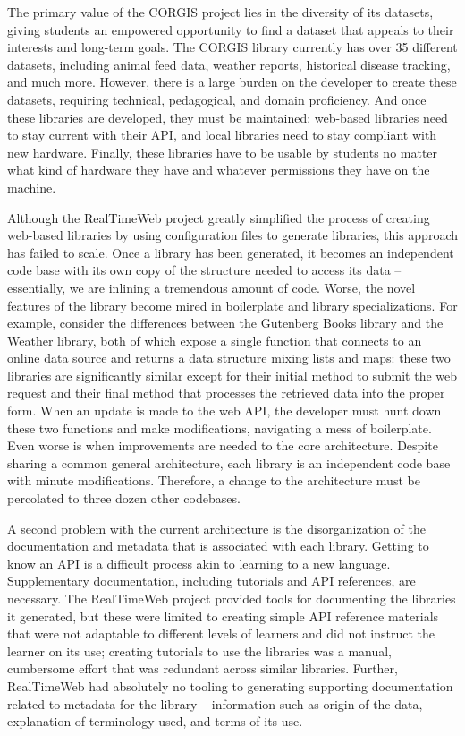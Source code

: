 	The primary value of the CORGIS project lies in the diversity of its datasets, giving students an empowered opportunity to find a dataset that appeals to their interests and long-term goals.
        The CORGIS library currently has over 35 different datasets, including animal feed data, weather reports, historical disease tracking, and much more.
    However, there is a large burden on the developer to create these datasets, requiring technical, pedagogical, and domain proficiency.
	And once these libraries are developed, they must be maintained: web-based libraries need to stay current with their API, and local libraries need to stay compliant with new hardware.
    Finally, these libraries have to be usable by students no matter what kind of hardware they have and whatever permissions they have on the machine.
    
    Although the RealTimeWeb project greatly simplified the process of creating web-based libraries by using configuration files to generate libraries, this approach has failed to scale.
    Once a library has been generated, it becomes an independent code base with its own copy of the structure needed to access its data -- essentially, we are inlining a tremendous amount of code.
    Worse, the novel features of the library become mired in boilerplate and library specializations.
    For example, consider the differences between the Gutenberg Books library and the Weather library, both of which expose a single function that connects to an online data source and returns a data structure mixing lists and maps: these two libraries are significantly similar except for their initial method to submit the web request and their final method that processes the retrieved data into the proper form.
    When an update is made to the web API, the developer must hunt down these two functions and make modifications, navigating a mess of boilerplate.
    Even worse is when improvements are needed to the core architecture.
    Despite sharing a common general architecture, each library is an independent code base with minute modifications.
    Therefore, a change to the architecture must be percolated to three dozen other codebases.
    
    A second problem with the current architecture is the disorganization of the documentation and metadata that is associated with each library.
    Getting to know an API is a difficult process akin to learning to a new language.
    Supplementary documentation, including tutorials and API references, are necessary.
    The RealTimeWeb project provided tools for documenting the libraries it generated, but these were limited to creating simple API reference materials that were not adaptable to different levels of learners and did not instruct the learner on its use; creating tutorials to use the libraries was a manual, cumbersome effort that was redundant across similar libraries.
    Further, RealTimeWeb had absolutely no tooling to generating supporting documentation related to metadata for the library -- information such as origin of the data, explanation of terminology used, and terms of its use.
    
